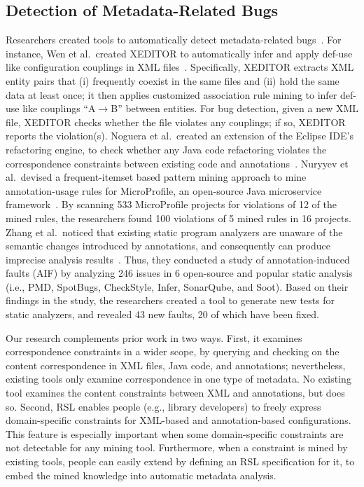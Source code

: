   \vspace{-.5em}
\subsection{Detection of Metadata-Related Bugs}

Researchers created tools to automatically detect metadata-related bugs~\cite{Noguera2012,Wen20,Nuryyev2022,Zhang2024}.
For instance, Wen et al.~created XEDITOR to automatically infer and apply def-use like configuration couplings in XML files~\cite{Wen20}. Specifically, XEDITOR extracts XML entity pairs that (i) frequently coexist in the same files and (ii) hold the same data at least once; it then applies customized association rule mining to infer def-use like couplings ``A$\rightarrow$B'' between entities. For bug detection, given a new XML file, XEDITOR checks whether the file violates any couplings; if so, XEDITOR reports the violation(s). 
Noguera et al.~created an extension of the Eclipse IDE's refactoring engine, to check whether any Java code refactoring violates the
correspondence constraints between existing code and annotations~\cite{Noguera2012}. 
Nuryyev et al.~devised a frequent-itemset based pattern mining approach to mine annotation-usage rules for MicroProfile, an open-source Java microservice framework~\cite{Nuryyev2022}. 
By scanning 533 MicroProfile projects for violations of 12 of the mined rules, the researchers found 100 violations of 5 mined rules in 16 projects. 
Zhang et al.~noticed that existing static program analyzers are unaware of the semantic changes introduced by annotations, and consequently can produce imprecise analysis results~\cite{Zhang2024}. Thus, they conducted a study of annotation-induced faults (AIF) by analyzing 246 issues in 6 open-source and popular static analysis (i.e., PMD, SpotBugs, CheckStyle, Infer, SonarQube, and Soot). Based on their findings in the study, the researchers created a tool to generate new tests for static analyzers, and revealed 43 new faults, 20 of which have been fixed.

Our research complements prior work in two ways. First, it examines correspondence constraints in a wider scope, by querying and checking on the content correspondence in XML files, Java code, and annotations; nevertheless, existing tools only examine correspondence in one type of metadata. 
No existing tool examines the content constraints between XML and annotations,  but \tool does so.
Second, RSL enables people (e.g., library developers) to freely express domain-specific constraints for XML-based and annotation-based configurations. This feature is especially important when some domain-specific constraints are not detectable for any mining tool.
Furthermore, when a constraint is mined by existing tools, people can easily extend \tool by defining an RSL specification for it, to embed the mined knowledge into automatic metadata analysis.

